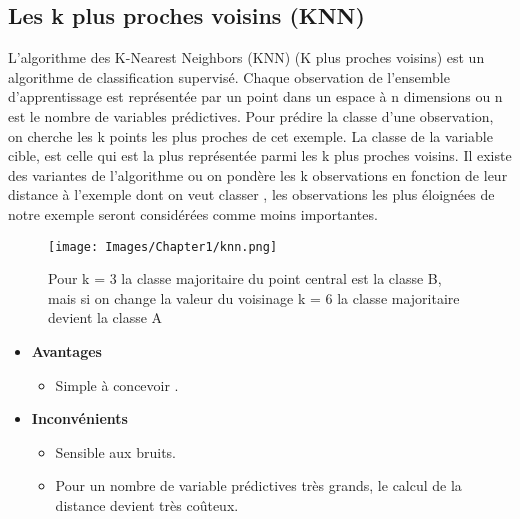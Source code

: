 \subsection{Les k plus proches voisins (KNN)}
L’algorithme des K-Nearest Neighbors (KNN) (K plus proches voisins) est un algorithme de classification supervisé. Chaque observation de l’ensemble d’apprentissage est représentée par un point dans un espace à n dimensions ou n est le nombre de variables prédictives. Pour prédire la classe d’une observation, on cherche les k points les plus proches de cet exemple. La classe de la variable cible, est celle qui est la plus représentée parmi les k plus proches voisins. Il existe des variantes de l’algorithme ou on pondère les k observations en fonction de leur distance à l’exemple dont on veut classer \cite{6}, les observations les plus éloignées de notre exemple seront considérées comme moins importantes.
\begin{figure}[h]
    \centering
    \texttt{[image: Images/Chapter1/knn.png]}
    \caption{Pour k = 3 la classe majoritaire du point central est la classe B, mais si on change la valeur du voisinage k = 6 la classe majoritaire devient la classe A}
    \label{fig:02}
    \end{figure}
    \begin{itemize}
        \item \textbf{Avantages }
        \begin{itemize}
            \item Simple à concevoir .
        \end{itemize}
    
        \item \textbf{Inconvénients}
        \begin{itemize}
            \item Sensible aux bruits.
            \item Pour un nombre de variable prédictives très grands, le calcul de la distance devient très coûteux.
        \end{itemize}
    \end{itemize}
